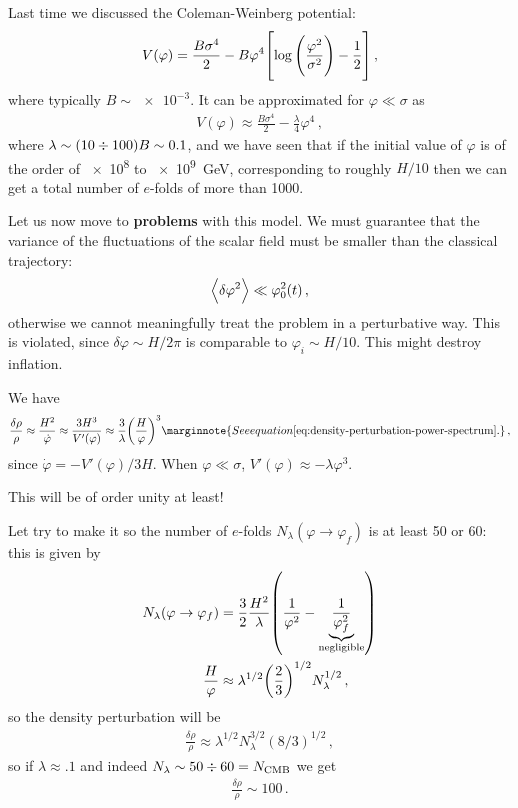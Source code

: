 \documentclass[main.tex]{subfiles}
\begin{document}

Last time we discussed the Coleman-Weinberg potential: 
%
\begin{align}
V(\varphi ) = \frac{B \sigma^{4}}{2} - B \varphi^{4}
\qty[\log \qty(\frac{\varphi^2}{\sigma^2}) - \frac{1}{2}]
\,,
\end{align}
%
where typically \(B \sim \num{e-3}\). 
It can be approximated for \(\varphi \ll \sigma \) as 
%
\begin{align}
V(\varphi ) \approx \frac{B \sigma^{4}}{2} - \frac{\lambda}{4} \varphi^{4}
\,,
\end{align}
%
where \(\lambda \sim (10 \divisionsymbol 100 )B \sim \num{.1}\), and we have seen that if the initial value of \(\varphi \) is of the order of \num{e8} to \SI{e9}{GeV}, corresponding to roughly \(H/10\) then we can get a total number of \(e\)-folds of more than 1000. 

Let us now move to \textbf{problems} with this model. 
We must guarantee that the variance of the fluctuations of the scalar field must be smaller than the classical trajectory: 
%
\begin{align}
\expval{ \delta \varphi^2} \ll \varphi_0^2 (t)
\,,
\end{align}
%
otherwise we cannot meaningfully treat the problem in a perturbative way. 
This is violated, since \(\delta \varphi \sim H / 2\pi \) is comparable to \(\varphi _i \sim H / 10\). 
This might destroy inflation. 

We have 
%
\begin{align}
\frac{ \delta \rho }{\rho } \approx \frac{H^2}{\dot{\varphi}} \approx \frac{3 H^3}{V'(\varphi )} \approx \frac{3}{\lambda } \qty(\frac{H}{\varphi })^3
\marginnote{See equation \eqref{eq:density-perturbation-power-spectrum}.}
\,,
\end{align}
%
since \(\dot{\varphi} = - V'(\varphi ) / 3H\). When \(\varphi \ll \sigma \), \(V' (\varphi ) \approx - \lambda \varphi^3\).

This will be of order unity at least! 

Let try to make it so the number of \(e\)-folds \(N_\lambda (\varphi \to \varphi _f)\) is at least 50 or 60: this is given by 
%
\begin{align}
N_\lambda (\varphi \to \varphi _f) &= \frac{3}{2} \frac{H^2}{\lambda } \qty( \frac{1}{\varphi^2} - \underbrace{\frac{1}{\varphi _f^2}}_{\text{negligible}})  \\
\frac{H}{\varphi } &\approx  \lambda^{1/2} \qty( \frac{2}{3})^{1/2} N_\lambda^{1/2}
\,,
\end{align}
%
so the density perturbation will be 
%
\begin{align}
\frac{ \delta \rho }{\rho } \approx \lambda^{1/2} N_\lambda^{3/2} (8/3)^{1/2}
\,,
\end{align}
%
so if \(\lambda \approx \num{.1}\) and indeed \(N_\lambda \sim 50 \divisionsymbol 60 = N _{\text{CMB}}\) we get 
%
\begin{align}
\frac{ \delta \rho }{\rho } \sim 100
\,.
\end{align}
\end{document}
